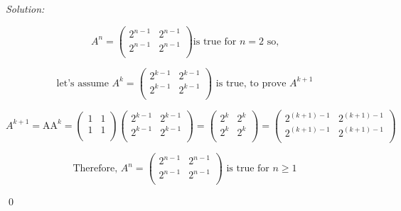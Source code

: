 \documentclass[12pt]{article}
\newenvironment{sol}
    {\emph{Solution:}
    }
    {
    \qed
    }
\begin{document}
\begin{sol}
\begin{equation}
A^n=\left(
\begin{array}{cc}
 2^{n-1} & 2^{n-1} \\
 2^{n-1} & 2^{n-1} \\
\end{array}
\right) \text{is true for } n=2 \text{ so,}
\end{equation}

\begin{equation}
\text{let's assume } A^k = \left(
\begin{array}{cc}
 2^{k-1} & 2^{k-1} \\
 2^{k-1} & 2^{k-1} \\
\end{array}
\right) \text{ is true, to prove } A^{k+1}
\end{equation}

\begin{equation}
A^{k+1}=\text{AA}^k=\left(
\begin{array}{cc}
 1 & 1 \\
 1 & 1 \\
\end{array}
\right) \left(
\begin{array}{cc}
 2^{k-1} & 2^{k-1} \\
 2^{k-1} & 2^{k-1} \\
\end{array}
\right)=\left(
\begin{array}{cc}
 2^k & 2^k \\
 2^k & 2^k \\
\end{array}
\right)=\left(
\begin{array}{cc}
 2^{(k+1)-1} & 2^{(k+1)-1} \\
 2^{(k+1)-1} & 2^{(k+1)-1} \\
\end{array}
\right)
\end{equation}

\begin{equation}
\text{Therefore, } A^n=\left(
\begin{array}{cc}
 2^{n-1} & 2^{n-1} \\
 2^{n-1} & 2^{n-1} \\
\end{array}
\right) \text{ is true for } n \geq 1
\end{equation}

\end{sol}
\end{document}
